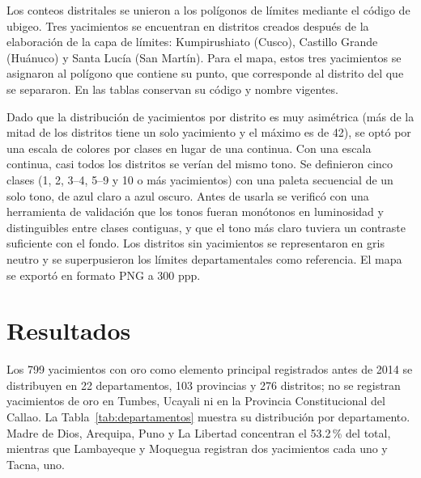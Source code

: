 \documentclass[man,12pt,a4paper,floatsintext,donotrepeattitle]{apa7}
\begin{document}
Los conteos distritales se unieron a los polígonos de límites mediante el código
de ubigeo. Tres yacimientos se encuentran en distritos creados después de la
elaboración de la capa de límites: Kumpirushiato (Cusco), Castillo Grande
(Huánuco) y Santa Lucía (San Martín). Para el mapa, estos tres yacimientos se
asignaron al polígono que contiene su punto, que corresponde al distrito del que
se separaron. En las tablas conservan su código y nombre vigentes.

Dado que la distribución de yacimientos por distrito es muy asimétrica (más de la
mitad de los distritos tiene un solo yacimiento y el máximo es de 42), se optó por una
escala de colores por clases en lugar de una continua. Con una escala continua,
casi todos los distritos se verían del mismo tono. Se definieron cinco clases (1,
2, 3--4, 5--9 y 10 o más yacimientos) con una paleta secuencial de un solo tono,
de azul claro a azul oscuro. Antes de usarla se verificó con una herramienta de
validación que los tonos fueran monótonos en luminosidad y distinguibles entre
clases contiguas, y que el tono más claro tuviera un contraste suficiente con el
fondo. Los distritos sin yacimientos se representaron en gris neutro y se
superpusieron los límites departamentales como referencia. El mapa se exportó en
formato PNG a 300 ppp.

\section{Resultados}

Los 799 yacimientos con oro como elemento principal registrados antes de 2014
se distribuyen en 22 departamentos, 103 provincias y 276 distritos; no se
registran yacimientos de oro en Tumbes, Ucayali ni en la Provincia
Constitucional del Callao. La Tabla~\ref{tab:departamentos} muestra su
distribución por departamento. Madre de Dios, Arequipa, Puno y La Libertad
concentran el 53.2\,\% del total, mientras que Lambayeque y Moquegua registran
dos yacimientos cada uno y Tacna, uno.
\end{document}
